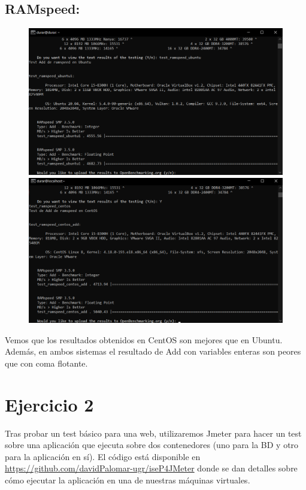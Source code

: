 \documentclass[a4paper]{article}
\begin{document}
\subsection*{\textbf{RAMspeed:}}
\begin{figure}[hbt!]
    \centering
    \includegraphics[width=\textwidth]{resultado ramspeed ubuntu.png}
    \includegraphics[width=\textwidth]{resultado ramspeed centos.png}
\end{figure}
Vemos que los resultados obtenidos en CentOS son mejores que en Ubuntu. Además, en ambos sistemas
el resultado de Add con variables enteras son peores que con coma flotante.
\newpage
\section{Ejercicio 2}
Tras probar un test básico para una web, utilizaremos Jmeter para hacer 
un test sobre una aplicación que ejecuta sobre dos contenedores (uno
para la BD y otro para la aplicación en sí). El código está disponible en 
\href{https://github.com/davidPalomar-ugr/iseP4JMeter}{https://github.com/davidPalomar-ugr/iseP4JMeter}
donde se dan detalles sobre cómo ejecutar la aplicación en una de nuestras máquinas virtuales.
\end{document}
